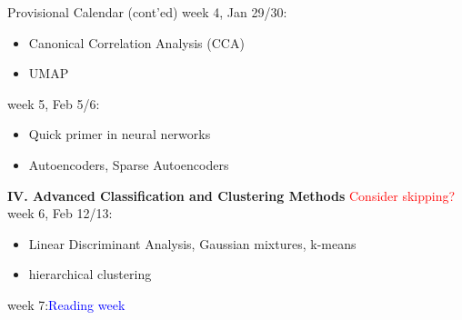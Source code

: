 \documentclass[11pt,handout,aspectratio=169]{beamer}
\begin{document}
\begin{frame}{Provisional Calendar (cont'ed)}
\small
week 4, Jan 29/30:\\[-1mm]
\begin{itemize}
\item Canonical Correlation Analysis (CCA)
\item UMAP
\end{itemize}

week 5, Feb 5/6:\\[-1mm]
  \begin{itemize}
  \item Quick primer in neural nerworks 
  \item Autoencoders, Sparse Autoencoders
  \end{itemize}

\noindent \textbf{IV. Advanced Classification and Clustering Methods}
\textcolor{red}{Consider skipping?}
week 6, Feb 12/13:\\[-1mm]
\begin{itemize}
\item Linear Discriminant Analysis, Gaussian mixtures, k-means
\item hierarchical clustering
\end{itemize}

week 7:\quad \textcolor{blue}{Reading week}
\end{frame}
\end{document}
